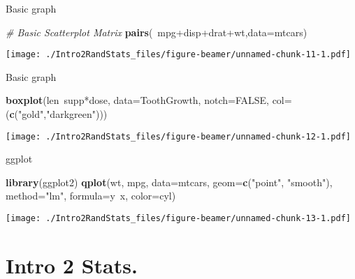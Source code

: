 \documentclass[ignorenonframetext,]{beamer}
\makeatletter
\newenvironment{Shaded}{\begin{snugshade}}{\end{snugshade}}
\newcommand{\KeywordTok}[1]{\textcolor[rgb]{0.13,0.29,0.53}{\textbf{{#1}}}}
\newcommand{\DataTypeTok}[1]{\textcolor[rgb]{0.13,0.29,0.53}{{#1}}}
\newcommand{\StringTok}[1]{\textcolor[rgb]{0.31,0.60,0.02}{{#1}}}
\newcommand{\CommentTok}[1]{\textcolor[rgb]{0.56,0.35,0.01}{\textit{{#1}}}}
\newcommand{\OtherTok}[1]{\textcolor[rgb]{0.56,0.35,0.01}{{#1}}}
\newcommand{\NormalTok}[1]{{#1}}
\def\maxwidth{\ifdim\Gin@nat@width>\linewidth\linewidth\else\Gin@nat@width\fi}
\def\maxheight{\ifdim\Gin@nat@height>\textheight0.8\textheight\else\Gin@nat@height\fi}
\renewcommand{\includegraphics}[2][]{%
    \Oldincludegraphics[#1,width=\maxwidth,height=\maxheight,keepaspectratio]{#2}}
\makeatother
\begin{document}
\begin{frame}[fragile]{Basic graph}

\begin{Shaded}
\begin{Highlighting}[]
\CommentTok{# Basic Scatterplot Matrix}
\KeywordTok{pairs}\NormalTok{(~mpg+disp+drat+wt,}\DataTypeTok{data=}\NormalTok{mtcars)}
\end{Highlighting}
\end{Shaded}

\texttt{[image: ./Intro2RandStats\_files/figure-beamer/unnamed-chunk-11-1.pdf]}

\end{frame}

\begin{frame}[fragile]{Basic graph}

\begin{Shaded}
\begin{Highlighting}[]
\KeywordTok{boxplot}\NormalTok{(len~supp*dose, }\DataTypeTok{data=}\NormalTok{ToothGrowth, }\DataTypeTok{notch=}\OtherTok{FALSE}\NormalTok{, }
  \DataTypeTok{col=}\NormalTok{(}\KeywordTok{c}\NormalTok{(}\StringTok{"gold"}\NormalTok{,}\StringTok{"darkgreen"}\NormalTok{)))}
\end{Highlighting}
\end{Shaded}

\texttt{[image: ./Intro2RandStats\_files/figure-beamer/unnamed-chunk-12-1.pdf]}

\end{frame}

\begin{frame}[fragile]{ggplot}

\begin{Shaded}
\begin{Highlighting}[]
\KeywordTok{library}\NormalTok{(ggplot2)}
\KeywordTok{qplot}\NormalTok{(wt, mpg, }\DataTypeTok{data=}\NormalTok{mtcars, }\DataTypeTok{geom=}\KeywordTok{c}\NormalTok{(}\StringTok{"point"}\NormalTok{, }\StringTok{"smooth"}\NormalTok{), }
   \DataTypeTok{method=}\StringTok{"lm"}\NormalTok{, }\DataTypeTok{formula=}\NormalTok{y~x, }\DataTypeTok{color=}\NormalTok{cyl)}
\end{Highlighting}
\end{Shaded}

\texttt{[image: ./Intro2RandStats\_files/figure-beamer/unnamed-chunk-13-1.pdf]}

\end{frame}

\section{Intro 2 Stats.}\label{intro-2-stats.}
\end{document}
